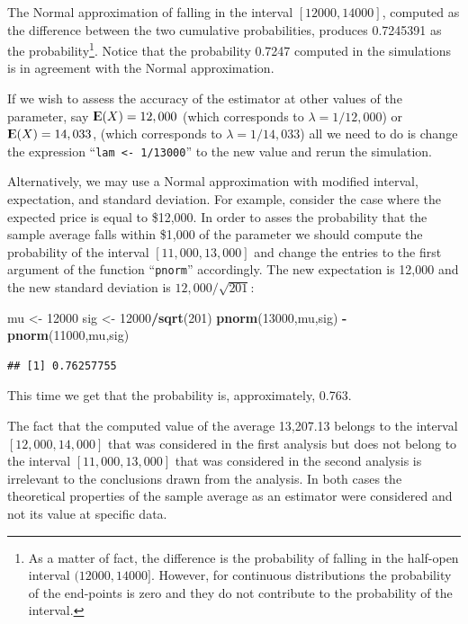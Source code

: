 \documentclass[]{krantz}
\makeatletter
\newenvironment{Shaded}{\begin{snugshade}}{\end{snugshade}}
\newcommand{\KeywordTok}[1]{\textcolor[rgb]{0.13,0.29,0.53}{\textbf{#1}}}
\newcommand{\DecValTok}[1]{\textcolor[rgb]{0.00,0.00,0.81}{#1}}
\newcommand{\StringTok}[1]{\textcolor[rgb]{0.31,0.60,0.02}{#1}}
\newcommand{\OperatorTok}[1]{\textcolor[rgb]{0.81,0.36,0.00}{\textbf{#1}}}
\newcommand{\NormalTok}[1]{#1}
\newcommand{\Expec}{{\rm I\kern-.3em E}}
\newenvironment{kframe}{%
\medskip{}
\setlength{\fboxsep}{.8em}
 \def\at@end@of@kframe{}%
 \ifinner\ifhmode%
  \def\at@end@of@kframe{\end{minipage}}%
  \begin{minipage}{\columnwidth}%
 \fi\fi%
 \def\FrameCommand##1{\hskip\@totalleftmargin \hskip-\fboxsep
 \colorbox{shadecolor}{##1}\hskip-\fboxsep
     \hskip-\linewidth \hskip-\@totalleftmargin \hskip\columnwidth}%
 \MakeFramed {\advance\hsize-\width
   \@totalleftmargin\z@ \linewidth\hsize
   \@setminipage}}%
 {\par\unskip\endMakeFramed%
 \at@end@of@kframe}
\renewenvironment{Shaded}{\begin{kframe}}{\end{kframe}}
\theoremstyle{definition}
\theoremstyle{definition}
\theoremstyle{definition}
\theoremstyle{remark}
\makeatother
\begin{document}
The Normal approximation of falling in the interval \([12000, 14000]\),
computed as the difference between the two cumulative probabilities,
produces 0.7245391 as the probability\footnote{As a matter of fact, the
  difference is the probability of falling in the half-open interval
  \((12000,14000]\). However, for continuous distributions the
  probability of the end-points is zero and they do not contribute to
  the probability of the interval.}. Notice that the probability 0.7247
computed in the simulations is in agreement with the Normal
approximation.

If we wish to assess the accuracy of the estimator at other values of
the parameter, say \(\Expec(X) = 12,000\) (which corresponds to
\(\lambda = 1/12,000\)) or \(\Expec(X) = 14,033\), (which corresponds to
\(\lambda = 1/14,033\)) all we need to do is change the expression
``\texttt{lam\ \textless{}-\ 1/13000}'' to the new value and rerun the
simulation.

Alternatively, we may use a Normal approximation with modified interval,
expectation, and standard deviation. For example, consider the case
where the expected price is equal to \$12,000. In order to asses the
probability that the sample average falls within \$1,000 of the
parameter we should compute the probability of the interval
\([11,000, 13,000]\) and change the entries to the first argument of the
function ``\texttt{pnorm}'' accordingly. The new expectation is 12,000
and the new standard deviation is \(12,000/\sqrt{201}\):

\begin{Shaded}
\begin{Highlighting}[]
\NormalTok{mu <-}\StringTok{ }\DecValTok{12000}
\NormalTok{sig <-}\StringTok{ }\DecValTok{12000}\OperatorTok{/}\KeywordTok{sqrt}\NormalTok{(}\DecValTok{201}\NormalTok{)}
\KeywordTok{pnorm}\NormalTok{(}\DecValTok{13000}\NormalTok{,mu,sig) }\OperatorTok{-}\StringTok{ }\KeywordTok{pnorm}\NormalTok{(}\DecValTok{11000}\NormalTok{,mu,sig)}
\end{Highlighting}
\end{Shaded}

\begin{verbatim}
## [1] 0.76257755
\end{verbatim}

This time we get that the probability is, approximately, 0.763.

The fact that the computed value of the average 13,207.13 belongs to the
interval \([12,000, 14,000]\) that was considered in the first analysis
but does not belong to the interval \([11,000, 13,000]\) that was
considered in the second analysis is irrelevant to the conclusions drawn
from the analysis. In both cases the theoretical properties of the
sample average as an estimator were considered and not its value at
specific data.
\end{document}
